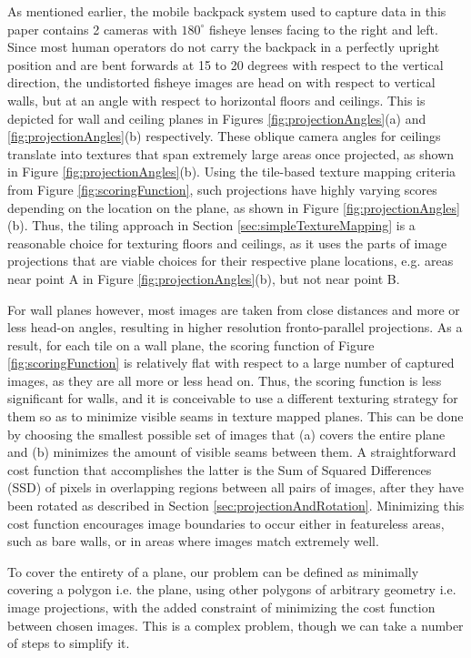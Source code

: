 \documentclass[10pt,twocolumn,letterpaper]{article}
\begin{document}
As mentioned earlier, the mobile backpack system used to capture data
in this paper contains 2 cameras with $180^\circ$ fisheye lenses
facing to the right and left. Since most human operators do not carry
the backpack in a perfectly upright position and are bent forwards at
15 to 20 degrees with respect to the vertical direction, the
undistorted fisheye images are head on with respect to vertical walls,
but at an angle with respect to horizontal floors and ceilings. This
is depicted for wall and ceiling planes in Figures
\ref{fig:projectionAngles}(a) and \ref{fig:projectionAngles}(b)
respectively. These oblique camera angles for ceilings translate into
textures that span extremely large areas once projected, as shown in
Figure \ref{fig:projectionAngles}(b). Using the tile-based texture
mapping criteria from Figure \ref{fig:scoringFunction}, such
projections have highly varying scores depending on the location on
the plane, as shown in Figure \ref{fig:projectionAngles}(b). Thus, the
tiling approach in Section \ref{sec:simpleTextureMapping} is a
reasonable choice for texturing floors and ceilings, as it uses the
parts of image projections that are viable choices for their
respective plane locations, e.g. areas near point A in Figure
\ref{fig:projectionAngles}(b), but not near point B.

For wall planes however, most images are taken from close distances
and more or less head-on angles, resulting in higher resolution
fronto-parallel projections. As a result, for each tile on a wall
plane, the scoring function of Figure \ref{fig:scoringFunction} is
relatively flat with respect to a large number of captured images, as
they are all more or less head on. Thus, the scoring function is less
significant for walls, and it is conceivable to use a different
texturing strategy for them so as to minimize visible seams in texture
mapped planes. This can be done by choosing the smallest possible set
of images that (a) covers the entire plane and (b) minimizes the
amount of visible seams between them. A straightforward cost function
that accomplishes the latter is the Sum of Squared Differences (SSD)
of pixels in overlapping regions between all pairs of images, after
they have been rotated as described in Section
\ref{sec:projectionAndRotation}. Minimizing this cost function
encourages image boundaries to occur either in featureless areas, such
as bare walls, or in areas where images match extremely well.

To cover the entirety of a plane, our problem can be defined as
minimally covering a polygon i.e. the plane, using other polygons of
arbitrary geometry i.e. image projections, with the added constraint
of minimizing the cost function between chosen images.  This is a
complex problem, though we can take a number of steps to simplify it.
\end{document}
